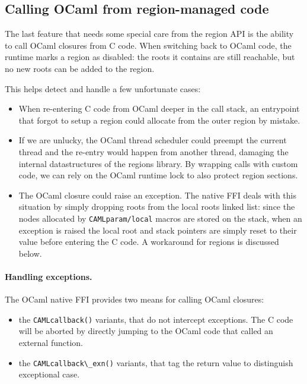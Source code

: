\documentclass[a4paper]{easychair}
\newcommand{\cpp}[1]{\lstinline[style=C++]{#1}}
\begin{document}
\subsection{Calling OCaml from region-managed code}

The last feature that needs some special care from the region API is the
ability to call OCaml closures from C code. When switching back to OCaml
code, the runtime marks a region as disabled: the roots it contains are
still reachable, but no new roots can be added to the region.

This helps detect and handle a few unfortunate cases:
%
\begin{itemize}
\item When re-entering C code from OCaml deeper in the call stack, an
      entrypoint that forgot to setup a region could allocate from the outer
      region by mistake.
\item If we are unlucky, the OCaml thread scheduler could preempt the
      current thread and the re-entry would happen from another
      thread, damaging the internal datastructures of the regions library. By
      wrapping calls with custom code, we can rely on the OCaml runtime lock to
      also protect region sections.
\item The OCaml closure could raise an exception. The native FFI deals with
      this situation by simply dropping roots from the local roots linked
      list: since the nodes allocated by \cpp{CAMLparam/local} macros are
      stored on the stack, when an exception is raised the local root and
      stack pointers are simply reset to their value before entering the C
      code. A workaround for regions is discussed below.
\end{itemize}

\paragraph{Handling exceptions.}

The OCaml native FFI provides two means for calling OCaml closures:
%
\begin{itemize}
\item the \cpp{CAMLcallback()} variants, that do not intercept
      exceptions. The C code will be aborted by directly jumping to the
      OCaml code that called an external function.
\item the \cpp{CAMLcallback\_exn()} variants, that tag the return value
      to distinguish exceptional case.
\end{itemize}
\end{document}
